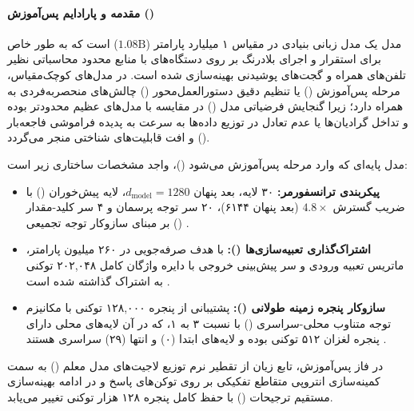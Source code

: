\item {}

\paragraph*{مقدمه و پارادایم پس‌آموزش ()}
مدل  \cite{huber2025mobilellmpro} یک مدل زبانی بنیادی در مقیاس ۱ میلیارد پارامتر ($1.08\text{B}$) است که به طور خاص برای استقرار و اجرای بلادرنگ بر روی دستگاه‌های با منابع محدود محاسباتی نظیر تلفن‌های همراه و گجت‌های پوشیدنی بهینه‌سازی شده است. در مدل‌های کوچک‌مقیاس، مرحله پس‌آموزش () یا تنظیم دقیق دستورالعمل‌محور () چالش‌های منحصر‌به‌فردی به همراه دارد؛ زیرا گنجایش فرضیاتی مدل () در مقایسه با مدل‌های عظیم محدودتر بوده و تداخل گرادیان‌ها یا عدم تعادل در توزیع داده‌ها به سرعت به پدیده فراموشی فاجعه‌بار () و افت قابلیت‌های شناختی منجر می‌گردد.

مدل پایه‌ای که وارد مرحله پس‌آموزش می‌شود ()، واجد مشخصات ساختاری زیر است:
\begin{itemize}
    \item \textbf{پیکربندی ترانسفورمر:} ۳۰ لایه، بعد پنهان $d_{\text{model}} = 1280$، لایه پیش‌خوران () با ضریب گسترش $4.8\times$ (بعد پنهان ۶۱۴۴)، ۲۰ سر توجه پرسمان و ۴ سر کلید-مقدار بر مبنای سازوکار توجه تجمیعی () \cite{ainslie2023gqa}.
    \item \textbf{اشتراک‌گذاری تعبیه‌سازی‌ها ():} با هدف صرفه‌جویی در ۲۶۰ میلیون پارامتر، ماتریس تعبیه ورودی و سر پیش‌بینی خروجی با دایره واژگان کامل ۲۰۲,۰۴۸ توکنی به اشتراک گذاشته شده است \cite{press2017output,liu2024mobilellm}.
    \item \textbf{سازوکار پنجره زمینه طولانی ():} پشتیبانی از پنجره ۱۲۸,۰۰۰ توکنی با مکانیزم توجه متناوب محلی-سراسری () با نسبت ۳ به ۱، که در آن لایه‌های محلی دارای پنجره لغزان ۵۱۲ توکنی بوده و لایه‌های ابتدا (۰) و انتها (۲۹) سراسری هستند \cite{beltagy2020longformer}.
\end{itemize}

در فاز پس‌آموزش، تابع زیان از تقطیر نرم توزیع لاجیت‌های مدل معلم () به سمت کمینه‌سازی انتروپی متقاطع تفکیکی بر روی توکن‌های پاسخ و در ادامه بهینه‌سازی مستقیم ترجیحات () با حفظ کامل پنجره ۱۲۸ هزار توکنی تغییر می‌یابد.

